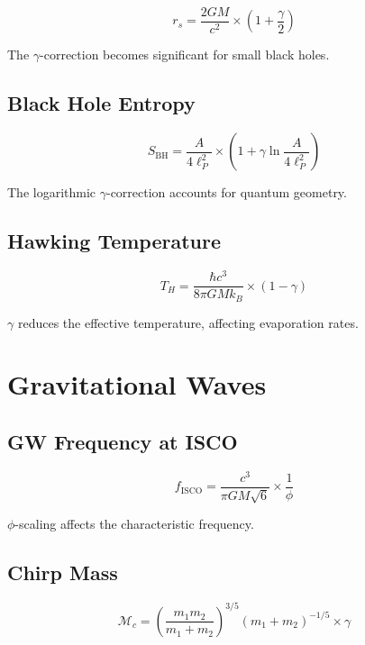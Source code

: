 \documentclass[12pt,a4paper]{article}
\begin{document}
\begin{equation}
r_s = \frac{2GM}{c^2} \times \left(1 + \frac{\gamma}{2}\right)
\end{equation}

The $\gamma$-correction becomes significant for small black holes.

\subsection{Black Hole Entropy}

\begin{equation}
S_{\text{BH}} = \frac{A}{4\ell_P^2} \times \left(1 + \gamma \ln\frac{A}{4\ell_P^2}\right)
\end{equation}

The logarithmic $\gamma$-correction accounts for quantum geometry.

\subsection{Hawking Temperature}

\begin{equation}
T_H = \frac{\hbar c^3}{8\pi GM k_B} \times (1 - \gamma)
\end{equation}

$\gamma$ reduces the effective temperature, affecting evaporation rates.

\section{Gravitational Waves}

\subsection{GW Frequency at ISCO}

\begin{equation}
f_{\text{ISCO}} = \frac{c^3}{\pi GM\sqrt{6}} \times \frac{1}{\phi}
\end{equation}

$\phi$-scaling affects the characteristic frequency.

\subsection{Chirp Mass}

\begin{equation}
\mathcal{M}_c = \left(\frac{m_1 m_2}{m_1 + m_2}\right)^{3/5} (m_1 + m_2)^{-1/5} \times \gamma
\end{equation}
\end{document}
